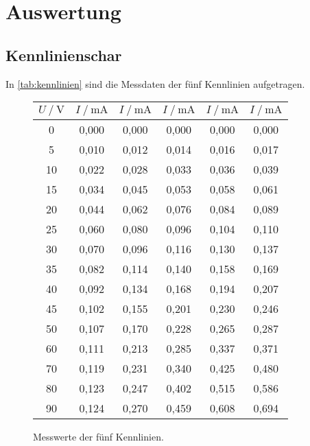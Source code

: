 \section{Auswertung}
\label{sec:Auswertung}

\subsection{Kennlinienschar}

In \autoref{tab:kennlinien} sind die Messdaten der fünf Kennlinien aufgetragen.

\begin{figure}
  \centering
  \caption{Messwerte der fünf Kennlinien.}
  \label{tab:kennlinien}
  \begin{tabular}{c c c c c c}
    \toprule
    $U \mathbin{/} \unit{\volt}$ &
    $I \mathbin{/} \unit{\milli\ampere}$ &
    $I \mathbin{/} \unit{\milli\ampere}$ &
    $I \mathbin{/} \unit{\milli\ampere}$ & 
    $I \mathbin{/} \unit{\milli\ampere}$ &
    $I \mathbin{/} \unit{\milli\ampere}$ \\
    \midrule
       0 & 0,000 &   0,000 &   0,000 &   0,000 &   0,000 \\
       5 & 0,010 &   0,012 &   0,014 &   0,016 &   0,017 \\
      10 & 0,022 &   0,028 &   0,033 &   0,036 &   0,039 \\
      15 & 0,034 &   0,045 &   0,053 &   0,058 &   0,061 \\
      20 & 0,044 &   0,062 &   0,076 &   0,084 &   0,089 \\
      25 & 0,060 &   0,080 &   0,096 &   0,104 &   0,110 \\
      30 & 0,070 &   0,096 &   0,116 &   0,130 &   0,137 \\
      35 & 0,082 &   0,114 &   0,140 &   0,158 &   0,169 \\
      40 & 0,092 &   0,134 &   0,168 &   0,194 &   0,207 \\
      45 & 0,102 &   0,155 &   0,201 &   0,230 &   0,246 \\
      50 & 0,107 &   0,170 &   0,228 &   0,265 &   0,287 \\
      60 & 0,111 &   0,213 &   0,285 &   0,337 &   0,371 \\
      70 & 0,119 &   0,231 &   0,340 &   0,425 &   0,480 \\
      80 & 0,123 &   0,247 &   0,402 &   0,515 &   0,586 \\
      90 & 0,124 &   0,270 &   0,459 &   0,608 &   0,694 \\

\end{tabular}
\end{figure}

